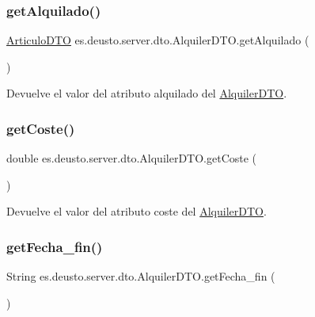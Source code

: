 \subsubsection{\texorpdfstring{getAlquilado()}{getAlquilado()}}
{\footnotesize\ttfamily \mbox{\hyperlink{classes_1_1deusto_1_1server_1_1dto_1_1_articulo_d_t_o}{Articulo\+D\+TO}} es.\+deusto.\+server.\+dto.\+Alquiler\+D\+T\+O.\+get\+Alquilado (\begin{DoxyParamCaption}{ }\end{DoxyParamCaption})}

Devuelve el valor del atributo alquilado del \mbox{\hyperlink{classes_1_1deusto_1_1server_1_1dto_1_1_alquiler_d_t_o}{Alquiler\+D\+TO}}. \mbox{\label{classes_1_1deusto_1_1server_1_1dto_1_1_alquiler_d_t_o_a70276af6a407faf0756e228c5481a696}} 
\subsubsection{\texorpdfstring{getCoste()}{getCoste()}}
{\footnotesize\ttfamily double es.\+deusto.\+server.\+dto.\+Alquiler\+D\+T\+O.\+get\+Coste (\begin{DoxyParamCaption}{ }\end{DoxyParamCaption})}

Devuelve el valor del atributo coste del \mbox{\hyperlink{classes_1_1deusto_1_1server_1_1dto_1_1_alquiler_d_t_o}{Alquiler\+D\+TO}}. \mbox{\label{classes_1_1deusto_1_1server_1_1dto_1_1_alquiler_d_t_o_a673ffee73348ad5df5dde0bd8294f614}} 
\subsubsection{\texorpdfstring{getFecha\_fin()}{getFecha\_fin()}}
{\footnotesize\ttfamily String es.\+deusto.\+server.\+dto.\+Alquiler\+D\+T\+O.\+get\+Fecha\+\_\+fin (\begin{DoxyParamCaption}{ }\end{DoxyParamCaption})}


